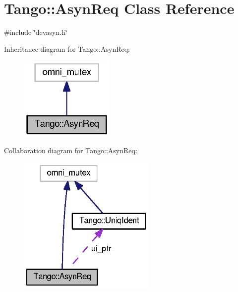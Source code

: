 \section{Tango\-:\-:Asyn\-Req Class Reference}
\label{classTango_1_1AsynReq}


{\ttfamily \#include \char`\"{}devasyn.\-h\char`\"{}}



Inheritance diagram for Tango\-:\-:Asyn\-Req\-:
\nopagebreak
\begin{figure}[H]
\begin{center}
\leavevmode
\includegraphics[width=130pt]{d3/d50/classTango_1_1AsynReq__inherit__graph}
\end{center}
\end{figure}


Collaboration diagram for Tango\-:\-:Asyn\-Req\-:
\nopagebreak
\begin{figure}[H]
\begin{center}
\leavevmode
\includegraphics[width=188pt]{d8/d5f/classTango_1_1AsynReq__coll__graph}
\end{center}
\end{figure}
